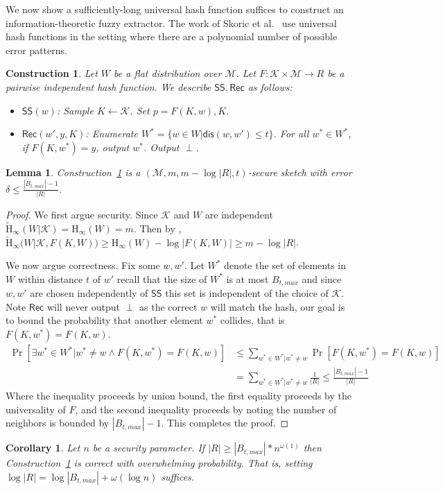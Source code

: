 \documentclass[11pt]{article}
\newcommand{\consref}[1]{\mbox{Construction~\ref{#1}}}
\newcommand{\class}[1]{{\ensuremath{\mathsf{#1}}}}
\newcommand{\sketch}{\ensuremath{\class{SS}}\xspace}
\newcommand{\rec}{\ensuremath{\class{Rec}}\xspace}
\newcommand{\dis}{\ensuremath{\mathsf{dis}}}
\newcommand{\Hoo}{\mathrm{H}_\infty}
\newcommand{\Hav}{\tilde{\mathrm{H}}_\infty}
\newtheorem{lemma}[theorem]{Lemma}
\newtheorem{corollary}[theorem]{Corollary}
\newtheorem{construction}[theorem]{Construction}
\begin{document}
We now show a sufficiently-long universal hash function suffices to construct an information-theoretic fuzzy extractor.  The work of Skoric et al.~\cite{skoric2009efficient} use universal hash functions in the setting where there are a polynomial number of possible error patterns.

\begin{construction}
\label{cons:pairwise hash}
Let $W$ be a flat distribution over $\mathcal{M}$.  Let $F :\mathcal{K}\times \mathcal{M}\rightarrow R$ be a pairwise independent hash function.  We describe $\sketch, \rec$ as follows:
\begin{itemize}
\item $\sketch(w)$:
\subitem Sample $K\leftarrow \mathcal{K}$.
\subitem Set $p = F(K, w), K$.
\item $\rec(w', y, K)$:
\subitem Enumerate $W^* = \{w \in W | \dis(w, w')\le t\}$.
\subitem For all $w^*\in W^*$, if $F(K, w^*) = y$, output $w^*$.
\subitem Output $\perp$.
\end{itemize}
\end{construction}
\begin{lemma}
\consref{cons:pairwise hash} is a $(\mathcal{M}, m, m - \log |R|, t)$-secure sketch with error $\delta \le \frac{|B_{t, max}|-1}{|R|}$. 
\end{lemma}
\begin{proof}
We first argue security.  Since $\mathcal{K}$ and $W$ are independent $\Hav(W | \mathcal{K}) = \Hoo(W) = m$.  Then by \cite[Lemma 2.2b]{DBLP:journals/siamcomp/DodisORS08}, $\Hav(W | \mathcal{K}, F(K, W)) \ge \Hoo(W) - \log |F(K, W)| \ge m - \log |R|$.

We now argue correctness.  Fix some $w, w'$.  Let $W^*$ denote the set of elements in $W$ within distance $t$ of $w'$ recall that the size of $W^*$ is at most $B_{t, max}$ and since $w, w'$ are chosen independently of $\sketch$ this set is independent of the choice of $\mathcal{K}$.  Note $\rec$ will never output $\perp$ as the correct $w$ will match the hash, our goal is to bound the probability that another element $w^*$ collides, that is $F(K, w^*) = F(K, w)$.
\begin{align*}
\Pr[\exists w^* \in W^* |w^* \neq w \wedge F(K, w^*) = F(K, w)] &\le \sum_{w^*\in W^* | w^*\neq w} \Pr[F(K, w^*) = F(K, w)] \\
 &= \sum_{w^*\in W^* | w^*\neq w} \frac{1}{|R|} \le \frac{|B_{t, max}|-1}{|R|}
\end{align*}
Where the inequality proceeds by union bound, the first equality proceeds by the universality of $F$, and the second inequality proceeds by noting the number of neighbors is bounded by $|B_{t, max}|-1$.  This completes the proof.
\end{proof}
\begin{corollary}
Let $n$ be a security parameter.  
If $|R| \ge |B_{t, max}|* n^{\omega(1)}$ then \consref{cons:pairwise hash} is correct with overwhelming probability.  That is, setting $\log |R| = \log |B_{t, max}| + \omega(\log n)$ suffices.
\end{corollary}
\end{document}
